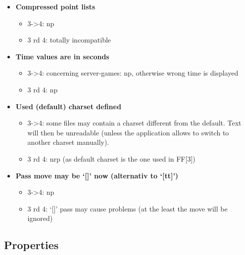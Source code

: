 \begin{itemize}
  \begin{itemize}
  \item
    3-\textgreater4: np
  \item
    3 rd 4: totally incompatible
  \end{itemize}
\item
  \textbf{Compressed point lists}

  \begin{itemize}
  \item
    3-\textgreater4: np
  \item
    3 rd 4: totally incompatible
  \end{itemize}
\item
  \textbf{Time values are in seconds}

  \begin{itemize}
  \item
    3-\textgreater4: concerning server-games: np, otherwise wrong time
    is displayed
  \item
    3 rd 4: np
  \end{itemize}
\item
  \textbf{Used (default) charset defined}

  \begin{itemize}
  \item
    3-\textgreater4: some files may contain a charset different from the
    default. Text will then be unreadable (unless the application allows
    to switch to another charset manually).
  \item
    3 rd 4: nrp (as default charset is the one used in FF{[}3{]})
  \end{itemize}
\item
  \textbf{Pass move may be `{[}{]}' now (alternativ to `{[}tt{]}')}

  \begin{itemize}
  \item
    3-\textgreater4: np
  \item
    3 rd 4: `{[}{]}' pass may cause problems (at the least the move will
    be ignored)
  \end{itemize}
\end{itemize}

\subsection{Properties}\label{properties-1}

